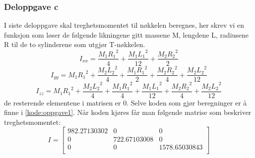 \subsubsection{Deloppgave c}
I siste deloppgave skal treghetsmomentet til nøkkelen beregnes, her skrev vi en funksjon som løser de følgende likningene gitt massene M, lengdene L, radiusene R til de to sylinderene som utgjør T-nøkkelen. \begin{equation}
    I_{xx}= \frac{M_1{R_1}^2}{4} + \frac{M_1{L_1}^2}{12} + \frac{M_2{R_2}^2}{2}
\end{equation}
\begin{equation}
    I_{yy}= M_1{R_1}^2 + \frac{M_2{L_2}^2}{4} + \frac{M_1{R_1}^2}{2} + \frac{M_2{R_2}^2}{4} + \frac{M_2{L_2}^2}{12}
\end{equation}
\begin{equation}
    I_{zz}= M_1{R_1}^2 + \frac{M_2{L_2}^2}{4} + \frac{M_1{R_1}^2}{4} + \frac{M_1{L_1}^2}{12} + \frac{M_2{R_2}^2}{4} + \frac{M_2{L_2}^2}{12}
\end{equation} 
\newline
de resterende elementene i matrisen er 0. Selve koden som gjør beregninger er å finne i \ref{kode:oppgave1}. Når koden kjøres får man følgende matrise som beskriver treghetsmomentet: \newline
\begin{equation}
I = 
\begin{bmatrix}
982.27130302 & 0 & 0\\
0 & 722.67103008 & 0\\
0 & 0 & 1578.65030843\\
\end{bmatrix}
\end{equation}